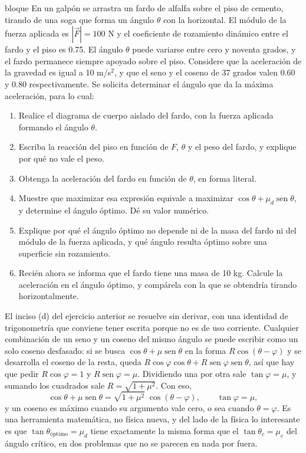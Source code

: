 \documentclass[11pt,openany]{book}
\newcommand{\sen}{\operatorname{sen}}
\begin{document}
\begin{ejercicio}{bloque}
En un galpón se arrastra un fardo de alfalfa sobre el piso de cemento, tirando de una soga que forma un ángulo $\theta$ con la horizontal. El módulo de la fuerza aplicada es $|\vec F| = 100$ N y el coeficiente de rozamiento dinámico entre el fardo y el piso es 0.75. El ángulo $\theta$ puede variarse entre cero y noventa grados, y el fardo permanece siempre apoyado sobre el piso. Considere que la aceleración de la gravedad es igual a 10 m/s$^2$, y que el seno y el coseno de 37 grados valen 0.60 y 0.80 respectivamente. Se solicita determinar el ángulo que da la máxima aceleración, para lo cual:
\begin{enumerate}[label=(\alph*), leftmargin=1.7em, itemsep=1pt, topsep=3pt]
  \item Realice el diagrama de cuerpo aislado del fardo, con la fuerza aplicada formando el ángulo $\theta$.
  \item Escriba la reacción del piso en función de $F$, $\theta$ y el peso del fardo, y explique por qué no vale el peso.
  \item Obtenga la aceleración del fardo en función de $\theta$, en forma literal.
  \item Muestre que maximizar esa expresión equivale a maximizar $\cos\theta + \mu_d\sen\theta$, y determine el ángulo óptimo. Dé su valor numérico.
  \item Explique por qué el ángulo óptimo no depende ni de la masa del fardo ni del módulo de la fuerza aplicada, y qué ángulo resulta óptimo sobre una superficie sin rozamiento.
  \item Recién ahora se informa que el fardo tiene una masa de 10 kg. Calcule la aceleración en el ángulo óptimo, y compárela con la que se obtendría tirando horizontalmente.
\end{enumerate}
\end{ejercicio}

El inciso (d) del ejercicio anterior se resuelve sin derivar, con una identidad de trigonometría que conviene tener escrita porque no es de uso corriente. Cualquier combinación de un seno y un coseno del mismo ángulo se puede escribir como un solo coseno desfasado: si se busca $\cos\theta + \mu\sen\theta$ en la forma $R\cos(\theta - \varphi)$ y se desarrolla el coseno de la resta, queda $R\cos\varphi\cos\theta + R\sen\varphi\sen\theta$, así que hay que pedir $R\cos\varphi = 1$ y $R\sen\varphi = \mu$. Dividiendo una por otra sale $\tan\varphi = \mu$, y sumando los cuadrados sale $R = \sqrt{1+\mu^2}$. Con eso,
\[
\cos\theta + \mu\sen\theta = \sqrt{1+\mu^{2}}\;\cos(\theta - \varphi) ,
\qquad \tan\varphi = \mu ,
\]
y un coseno es máximo cuando su argumento vale cero, o sea cuando $\theta = \varphi$. Es una herramienta matemática, no física nueva, y del lado de la física lo interesante es que $\tan\theta_{\text{óptimo}} = \mu_d$ tiene exactamente la misma forma que el $\tan\theta_c = \mu_e$ del ángulo crítico, en dos problemas que no se parecen en nada por fuera.
\end{document}
